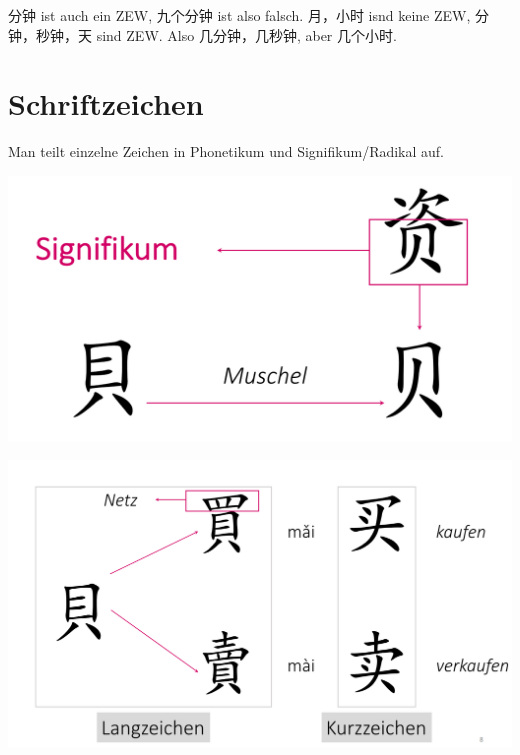 \documentclass[UTF8]{ctexart}
\begin{document}
分钟 ist auch ein ZEW, 九个分钟 ist also falsch. 月，小时 isnd keine ZEW, 分钟，秒钟，天 sind ZEW. Also 几分钟，几秒钟, aber 几个小时.

\section{Schriftzeichen}

Man teilt einzelne Zeichen in Phonetikum und Signifikum/Radikal auf.

\includegraphics[width=\linewidth]{signifikum.png}

\includegraphics[width=\linewidth]{mai.png}
\end{document}

